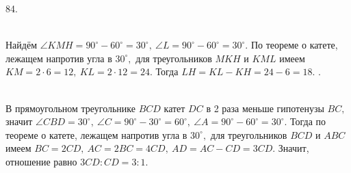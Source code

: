 84. \begin{figure}[ht!]
\end{figure}\\
Найдём $\angle KMH=90^\circ-60^\circ=30^\circ,\ \angle L=90^\circ-60^\circ=30^\circ.$ По теореме о катете, лежащем напротив угла в $30^\circ,$ для треугольников $MKH$ и $KML$ имеем $KM=2\cdot6=12,\ KL=2\cdot12=24.$ Тогда $LH=KL-KH=24-6=18.$\newpage
{}. \begin{figure}[ht!]
\end{figure}\\
В прямоугольном треугольнике $BCD$ катет $DC$ в 2 раза меньше гипотенузы $BC,$ значит $\angle CBD=30^\circ,\ \angle C=90^\circ-30^\circ=60^\circ,\ \angle A=90^\circ-60^\circ=30^\circ.$ Тогда по теореме о катете, лежащем напротив угла в $30^\circ,$ для треугольников $BCD$ и $ABC$ имеем $BC=2CD,\ AC=2BC=4CD,\ AD=AC-CD=3CD.$ Значит, отношение равно $3CD:CD=3:1.$\\
